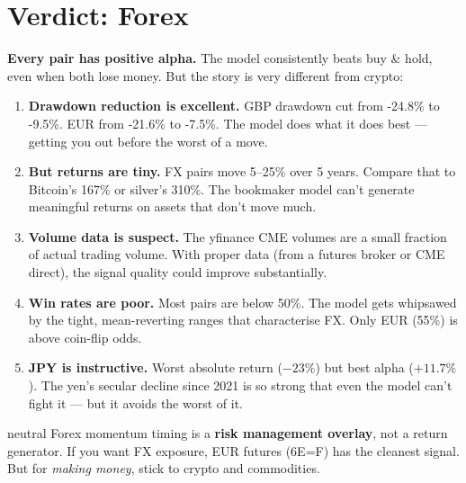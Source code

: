 \documentclass[11pt,a4paper]{article}
\begin{document}
\section{Verdict: Forex}

\textbf{Every pair has positive alpha.} The model consistently beats
buy \& hold, even when both lose money. But the story is very
different from crypto:

\begin{enumerate}[leftmargin=2em]
    \item \textbf{Drawdown reduction is excellent.} GBP drawdown cut
          from -24.8\% to -9.5\%. EUR from -21.6\% to -7.5\%. The
          model does what it does best --- getting you out before the
          worst of a move.

    \item \textbf{But returns are tiny.} FX pairs move 5--25\% over
          5 years. Compare that to Bitcoin's 167\% or silver's 310\%.
          The bookmaker model can't generate meaningful returns on
          assets that don't move much.

    \item \textbf{Volume data is suspect.} The yfinance CME volumes
          are a small fraction of actual trading volume. With proper
          data (from a futures broker or CME direct), the signal
          quality could improve substantially.

    \item \textbf{Win rates are poor.} Most pairs are below 50\%.
          The model gets whipsawed by the tight, mean-reverting
          ranges that characterise FX. Only EUR (55\%) is above
          coin-flip odds.

    \item \textbf{JPY is instructive.} Worst absolute return
          ($-23\%$) but best alpha ($+11.7\%$). The yen's secular
          decline since 2021 is so strong that even the model can't
          fight it --- but it avoids the worst of it.
\end{enumerate}

\begin{resultbox}{neutral}
Forex momentum timing is a \textbf{risk management overlay}, not a
return generator. If you want FX exposure, EUR futures (6E=F) has the
cleanest signal. But for \emph{making money}, stick to crypto and
commodities.
\end{resultbox}

\newpage
\end{document}
